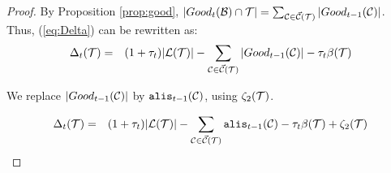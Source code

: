 \documentclass{acmsmall}
\newcommand{\cB}{{\cal B}}
\newcommand{\cC}{{\cal C}}
\newcommand{\cL}{{\cal L}}
\newcommand{\cT}{{\cal T}}
\newcommand{\alis}{{\tt alis}}
\newcommand{\errorterm}{\zeta}
\begin{document}
\begin{proof} 
By Proposition \ref{prop:good}, $|Good_t(\cB)\cap \cT|=\sum_{\cC \in \vec{\cC}(\cT)} |Good_{t-1}(\cC)|$. Thus,
(\ref{eq:Delta}) can be rewritten as:
%
\begin{eqnarray}
\nonumber
\Delta_t(\cT) & = & (1+\tau_t) |\cL(\cT)| - \sum_{\cC \in \vec{\cC}(\cT)} |Good_{t-1}(\cC)| - \tau_t \beta(\cT) 
\end{eqnarray}
%

We replace $|Good_{t-1}(\cC)|$ by $\alis_{t-1}(\cC)$, using $\errorterm_2(\cT)$. 

\begin{eqnarray*}
\label{eq:Delta2}
\Delta_t(\cT)
& = & (1+\tau_t)|\cL(\cT)| - \sum_{\cC \in \vec{\cC}(\cT)} \alis_{t-1}(\cC) - \tau_t \beta(\cT) + \errorterm_2(\cT)
\end{eqnarray*}


\end{proof}
\end{document}
